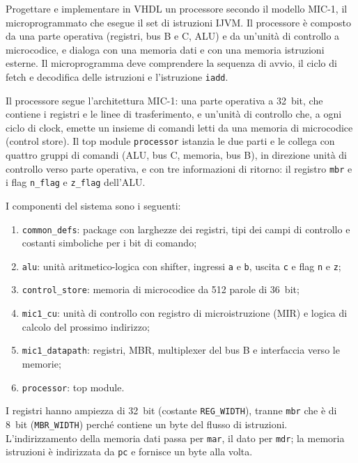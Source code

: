 \label{sec:esercizio9-1}

\begin{traccia}
Progettare e implementare in VHDL un processore secondo il modello MIC-1, il microprogrammato che esegue il set di istruzioni IJVM. Il processore è composto da una parte operativa (registri, bus B e C, ALU) e da un'unità di controllo a microcodice, e dialoga con una memoria dati e con una memoria istruzioni esterne. Il microprogramma deve comprendere la sequenza di avvio, il ciclo di fetch e decodifica delle istruzioni e l'istruzione \texttt{iadd}.
\end{traccia}


\progetto

Il processore segue l'architettura MIC-1: una parte operativa a \SI{32}{bit}, che contiene i registri e le linee di trasferimento, e un'unità di controllo che, a ogni ciclo di clock, emette un insieme di comandi letti da una memoria di microcodice (control store). Il top module \texttt{processor} istanzia le due parti e le collega con quattro gruppi di comandi (ALU, bus C, memoria, bus B), in direzione unità di controllo verso parte operativa, e con tre informazioni di ritorno: il registro \texttt{mbr} e i flag \texttt{n\_flag} e \texttt{z\_flag} dell'ALU.

I componenti del sistema sono i seguenti:
\begin{enumerate}
  \item \texttt{common\_defs}: package con larghezze dei registri, tipi dei campi di controllo e costanti simboliche per i bit di comando;
  \item \texttt{alu}: unità aritmetico-logica con shifter, ingressi \texttt{a} e \texttt{b}, uscita \texttt{c} e flag \texttt{n} e \texttt{z};
  \item \texttt{control\_store}: memoria di microcodice da 512 parole di \SI{36}{bit};
  \item \texttt{mic1\_cu}: unità di controllo con registro di microistruzione (MIR) e logica di calcolo del prossimo indirizzo;
  \item \texttt{mic1\_datapath}: registri, MBR, multiplexer del bus B e interfaccia verso le memorie;
  \item \texttt{processor}: top module.
\end{enumerate}

I registri hanno ampiezza di \SI{32}{bit} (costante \texttt{REG\_WIDTH}), tranne \texttt{mbr} che è di \SI{8}{bit} (\texttt{MBR\_WIDTH}) perché contiene un byte del flusso di istruzioni. L'indirizzamento della memoria dati passa per \texttt{mar}, il dato per \texttt{mdr}; la memoria istruzioni è indirizzata da \texttt{pc} e fornisce un byte alla volta.

